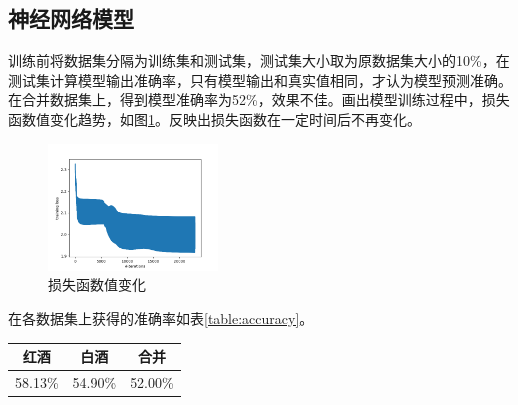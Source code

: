 \documentclass{article}
\begin{document}
\subsection{神经网络模型}

训练前将数据集分隔为训练集和测试集，测试集大小取为原数据集大小的10\%，在测试集计算模型输出准确率，只有模型输出和真实值相同，才认为模型预测准确。在合并数据集上，得到模型准确率为52\%，效果不佳。画出模型训练过程中，损失函数值变化趋势，如图\ref{fig:loss}。反映出损失函数在一定时间后不再变化。

\begin{figure}[htbp] %
    \centering %
    \includegraphics[width=0.4\textwidth]{loss_plot.png}
    \caption{损失函数值变化}
    \label{fig:loss}
\end{figure}

在各数据集上获得的准确率如表\ref{table:accuracy}。

\begin{center}
    \begin{tabular}{ c c c }
        红酒 & 白酒 & 合并 \\
        \hline
        58.13\% & 54.90\% & 52.00\%
    \end{tabular}
    \label{table:accuracy}
\end{center}
\end{document}
